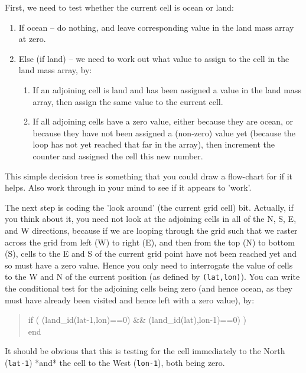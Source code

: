 \documentclass{tufte-book} %
\newenvironment{docspec}{\begin{quotation}\ttfamily\parskip0pt\parindent0pt\ignorespaces}{\end{quotation}}
\begin{document}
First, we need to test whether the current cell is ocean or land:

\begin{enumerate}[noitemsep]
\setlength{\itemindent}{.2in}
\item If ocean -- do nothing, and leave corresponding value in the land mass array at zero.
\item Else (if land) -- we need to work out what value to assign to the cell in the land mass array, by:
\begin{enumerate}[noitemsep]
\setlength{\itemindent}{.2in}
\item If an adjoining cell is land and has been assigned a value in the land mass array, then assign the same value to the current cell.
\item If all adjoining cells have a zero value, either because they are ocean, or because they have not been assigned a (non-zero) value yet (because the loop has not yet reached that far in the array), then increment the counter and assigned the cell this new number.
\end{enumerate}
\end{enumerate}

\noindent This simple decision tree is something that you could draw a flow-chart for if it helps. Also work through in your mind to see if it appears to 'work'.

The next step is coding the 'look around' (the current grid cell) bit. Actually, if you think about it, you need not look at the adjoining cells in all of the N, S, E, and W directions, because if we are looping through the grid  such that we raster across the grid from left (W) to right (E), and then from the top (N) to bottom (S), cells to the E and S of the current grid point have not been reached yet and so must have a zero value. Hence you only need to interrogate the value of cells to the W and N of the current position (as defined by \texttt{(lat,lon)}). You can write the conditional test for the adjoining cells being zero (and hence ocean, as they must have already been visited and hence left with a zero value), by:

\begin{docspec}
if ( (land\_id(lat-1,lon)==0) \&\& (land\_id(lat),lon-1)==0) )
\\end
\end{docspec}
It should be obvious that this is testing for the cell immediately to the North (\texttt{lat-1}) *and* the cell to the West (\texttt{lon-1}), both being zero.  
\end{document}

